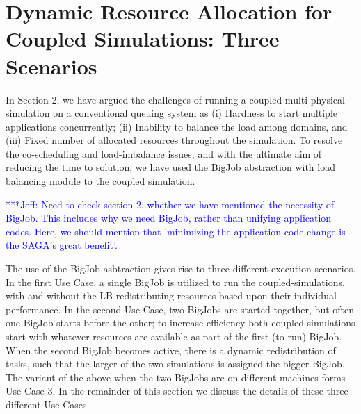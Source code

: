 \documentclass[conference,final]{IEEEtran}
\newcommand{\skonote}[1]{ {\textcolor{blue} { ***Jeff: #1 }}}
\newcommand{\skonote}[1]{}
\begin{document}





\section{Dynamic Resource Allocation for Coupled Simulations: Three Scenarios }

In Section 2, we have argued the challenges of running a coupled
multi-physical simulation on a conventional queuing system as (i)
Hardness to start multiple applications concurrently; (ii) Inability
to balance the load among domains, and (iii) Fixed number of allocated
resources throughout the simulation. To resolve the co-scheduling and
load-imbalance issues, and with the ultimate aim of reducing the time
to solution, we have used the BigJob abstraction with load balancing
module to the coupled simulation.

\skonote{Need to check section 2, whether we have mentioned the necessity of BigJob. This includes why we need BigJob, rather than unifying application codes. Here, we should mention that 'minimizing the application code change is the SAGA's great benefit'.}


The use of the BigJob asbtraction gives rise to three different execution scenarios. In the first Use Case, a single BigJob is utilized to run the coupled-simulations, with
and without the LB redistributing resources based upon their individual performance. 
In the second Use Case, two BigJobs are started together, but often one BigJob starts before the other; to increase efficiency both coupled simulations start with whatever resources are available as part of the first (to run) BigJob. When the second BigJob becomes active, there is a dynamic redistribution of tasks, such that the larger of the two simulations is assigned the bigger BigJob. The variant of the above when the two BigJobs are on different machines forms Use Case 3. In the remainder of this section we discuss the details of these three different Use Cases.
\end{document}

